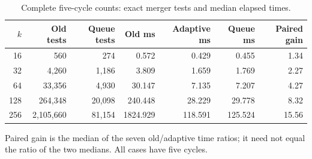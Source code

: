 \begin{table}[htbp]
\centering
\small
\begin{tabular}{rrrrrrr}
\toprule
$k$ & Old tests & Queue tests & Old ms & Adaptive ms & Queue ms & Paired gain \\
\midrule
16 & 560 & 274 & 0.572 & 0.429 & 0.455 & 1.34 \\
32 & 4,260 & 1,186 & 3.809 & 1.659 & 1.769 & 2.27 \\
64 & 33,356 & 4,930 & 30.147 & 7.135 & 7.207 & 4.27 \\
128 & 264,348 & 20,098 & 240.448 & 28.229 & 29.778 & 8.32 \\
256 & 2,105,660 & 81,154 & 1824.929 & 118.591 & 125.524 & 15.56 \\
\bottomrule
\end{tabular}
\caption{Complete five-cycle counts: exact merger tests and median elapsed times.}
\label{tab:five-cycle}
\par\smallskip\footnotesize Paired gain is the median of the seven old/adaptive time ratios; it need not equal the ratio of the two medians. All cases have five cycles.
\end{table}
